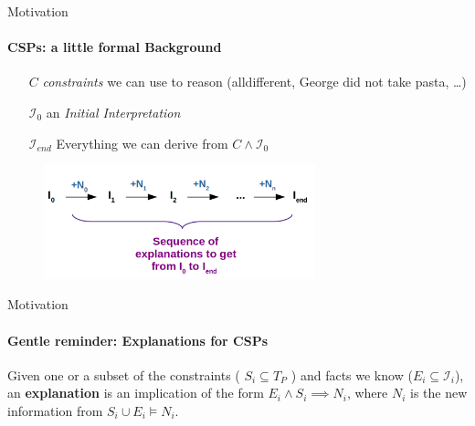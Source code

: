 \documentclass[handout]{beamer}
\newcommand\m[1]{\ensuremath{#1}\xspace}
\begin{document}
	\begin{frame}{Motivation}
		\framesubtitle{CSPs: a little formal Background}
		
		\begin{itemize}
			\item[$\m{C}$] \emph{constraints} we can use to reason (alldifferent, George did not take pasta, …)
			\item[$\mathcal{I}_0$] an \emph{Initial Interpretation}
			\item[$\mathcal{I}_{end}$] Everything we can derive from $ \m{C} \wedge \mathcal{I}_0$
		\end{itemize}
		\begin{figure}
			\includegraphics[width=0.7\textwidth]{sequence_explanation.png}
		\end{figure}
	\end{frame}
	
	
	\begin{frame}{Motivation}
		\framesubtitle{Gentle reminder: Explanations for CSPs}
		\begin{definition}
			Given one or a subset of the constraints ( $S_i \subseteq T_P$  ) and facts we know ($E_i\subseteq \mathcal{I}_i$), an \textbf{explanation} is an implication of the form $E_i \wedge S_i  \implies N_i $, where $N_i$ is the new information from $S_i \cup E_i \models N_i$. \cite{bogaerts2020step}
		\end{definition}
		
	\end{frame}
	
\end{document}
